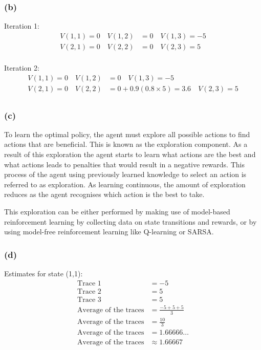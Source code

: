 \documentclass[10pt]{article}
\begin{document}
\subsubsection*{(b)}

Iteration 1:
\begin{align*}
    V(1,1) = 0 \quad V(1,2) &= 0 \quad V(1,3) = -5 \\
    V(2,1) = 0 \quad V(2,2) &= 0 \quad V(2,3) = 5 \\
\end{align*}

Iteration 2:
\begin{align*}
    V(1,1) = 0 \quad V(1,2) &= 0 \quad V(1,3) = -5 \\
    V(2,1) = 0 \quad V(2,2) &= 0 + 0.9(0.8\times 5) = 3.6 \quad V(2,3) = 5 \\
\end{align*}

\subsubsection*{(c)}

To learn the optimal policy, the agent must explore all possible actions to find actions that are
beneficial. This is known as the exploration component. As a result of this exploration the agent starts
to learn what actions are the best and what actions leads to penalties that would result in a negative
rewards. This process of the agent using previously learned knowledge to select an action
is referred to as exploration. As learning continuous, the amount of exploration reduces as the agent
recognises which action is the best to take. 

This exploration can be either performed by making use of model-based reinforcement learning by collecting
data on state transitions and rewards, or by using model-free reinforcement learning like
Q-learning or SARSA.

\subsubsection*{(d)}

Estimates for state (1,1):
\begin{align*}
    \text{Trace 1} &= -5 \\
    \text{Trace 2} &= 5 \\
    \text{Trace 3} &= 5 \\
    \text{Average of the traces} &= \frac{-5+5+5}{3} \\
    \text{Average of the traces} &= \frac{10}{3} \\
    \text{Average of the traces} &= 1.66666\dots \\
    \text{Average of the traces} &\approx 1.66667
\end{align*}
\end{document}
